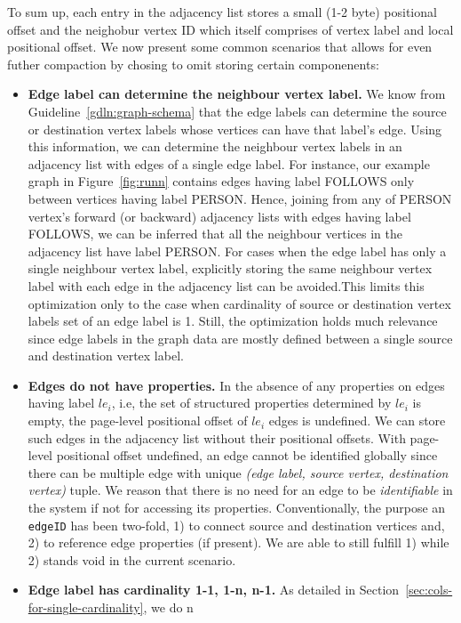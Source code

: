 To sum up, each entry in the adjacency list stores a small (1-2 byte) positional offset and the neighobur vertex ID which itself comprises of vertex label and local positional offset. We now present some common scenarios that allows for even futher compaction by chosing to omit storing certain componenents:

\begin{itemize}
	\item \textbf{Edge label can determine the neighbour vertex label.} We know from Guideline~\ref{gdln:graph-schema} that the edge labels can determine the source or destination vertex labels whose vertices can have that label's edge. Using this information, we can determine the neighbour vertex labels in an adjacency list with edges of a single edge label. For instance, our example graph in Figure~\ref{fig:runn} contains edges having label FOLLOWS only between vertices having label PERSON. Hence, joining from any of PERSON vertex's forward (or backward) adjacency lists with edges having label FOLLOWS, we can be inferred that all the neighbour vertices in the adjacency list have label PERSON. For cases when the edge label has only a single neighbour vertex label, explicitly storing the same neighbour vertex label with each edge in the adjacency list can be avoided.This limits this optimization only to the case when cardinality of source or destination vertex labels set of an edge label is 1. Still, the optimization holds much relevance since edge labels in the graph data are mostly defined between a single source and destination vertex label. 
	
	\item \textbf{Edges do not have properties.} In the absence of any properties on edges having label $le_i$, i.e, the set of structured properties determined by $le_i$ is empty, the page-level positional offset of $le_i$ edges is undefined. We can store such edges in the adjacency list without their positional offsets. With page-level positional offset undefined, an edge cannot be identified globally since there can be multiple edge with unique \emph{(edge label, source vertex, destination vertex)} tuple. We reason that there is no need for an edge to be \emph{identifiable} in the system if not for accessing its properties. Conventionally, the purpose an  \texttt{edgeID} has been two-fold, 1) to connect source and destination vertices and, 2) to reference edge properties (if present). We are able to still fulfill 1) while 2) stands void in the current scenario. 
	
	\item \textbf{Edge label has cardinality 1-1, 1-n, n-1.} As detailed in Section~\ref{sec:cols-for-single-cardinality}, we do n
	
\end{itemize}

